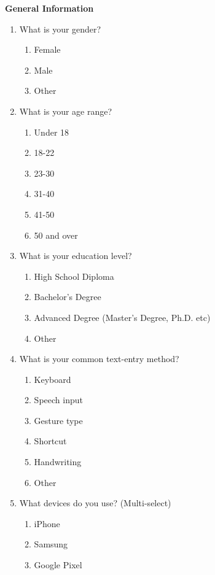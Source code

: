 \documentclass[acmsmall,screen,authorversion,nonacm]{acmart}
\begin{document}
\textbf{General Information}
\begin{enumerate}
    \item What is your gender?
        \begin{enumerate}
            \item Female
            \item Male
            \item Other
        \end{enumerate}
    \item What is your age range?
        \begin{enumerate}
            \item Under 18
            \item 18-22
            \item 23-30
            \item 31-40
            \item 41-50
            \item 50 and over
        \end{enumerate}
    \item What is your education level?
        \begin{enumerate}
            \item High School Diploma
            \item Bachelor's Degree
            \item Advanced Degree (Master's Degree, Ph.D. etc)
            \item Other
        \end{enumerate}
    \item What is your common text-entry method? 
        \begin{enumerate}
            \item Keyboard
            \item Speech input
            \item Gesture type
            \item Shortcut
            \item Handwriting
            \item Other
        \end{enumerate}
        \item What devices do you use?  (Multi-select)
            \begin{enumerate}
                \item iPhone
                \item Samsung
                \item Google Pixel

\end{enumerate}
\end{enumerate}
\end{document}
